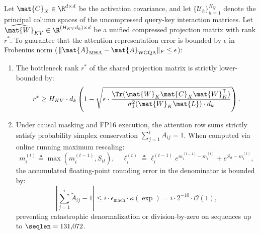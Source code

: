 \begin{theorem}
\label{thm:wgqa_rank_bound}
Let $\mat{C}_X \in \R^{d \times d}$ be the activation covariance, and let $\{\mathcal{U}_h\}_{h=1}^{H_Q}$ denote the principal column spaces of the uncompressed query-key interaction matrices. Let $\widehat{\mat{W}}_{KV} \in \R^{(H_{KV} d_k) \times d}$ be a unified compressed projection matrix with rank $r^*$. To guarantee that the attention representation error is bounded by $\epsilon$ in Frobenius norm ($\|\mat{A}_{\text{MHA}} - \mat{A}_{\text{WGQA}}\|_F \le \epsilon$):
\begin{enumerate}
    \item The bottleneck rank $r^*$ of the shared projection matrix is strictly lower-bounded by:
    \begin{equation}
    r^* \ge H_{KV} \cdot d_k \left( 1 - \sqrt{\epsilon \cdot \frac{\Tr(\mat{W}_K \mat{C}_X \mat{W}_K^\top)}{\sigma_1^2(\mat{W}_K \mat{L}) \cdot d_k}} \right).
    \label{eq:thm7_rank_lower_bound}
    \end{equation}
    \item Under causal masking and FP16 execution, the attention row sums strictly satisfy probability simplex conservation $\sum_{j=1}^i A_{ij} = 1$. When computed via online running maximum rescaling:
    \begin{equation}
    m_i^{(t)} \triangleq \max(m_i^{(t-1)}, S_{it}), \quad \ell_i^{(t)} \triangleq \ell_i^{(t-1)} e^{m_i^{(t-1)} - m_i^{(t)}} + e^{S_{it} - m_i^{(t)}},
    \label{eq:online_softmax}
    \end{equation}
    the accumulated floating-point rounding error in the denominator is bounded by:
    \begin{equation}
    \left| \sum_{j=1}^i \widetilde{A}_{ij} - 1 \right| \le i \cdot \epsilon_{\text{mach}} \cdot \kappa(\exp) = i \cdot 2^{-10} \cdot \mathcal{O}(1),
    \label{eq:thm7_simplex_error}
    \end{equation}
    preventing catastrophic denormalization or division-by-zero on sequences up to $\seqlen = 131{,}072$.
\end{enumerate}
\end{theorem}

